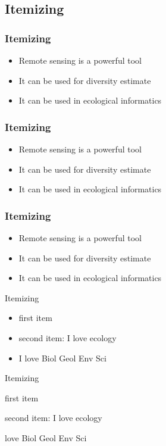 \subsection{Itemizing}

\begin{frame}
 \frametitle{Itemizing}
 \begin{itemize} %
  \item Remote sensing is a powerful tool
  \item It can be used for diversity estimate
  \item It can be used in ecological informatics
 \end{itemize}
\end{frame}


\begin{frame}
 \frametitle{Itemizing}
 \begin{itemize} %
  \item<1> Remote sensing is a powerful tool
  \item<2> It can be used for diversity estimate
  \item<3> It can be used in ecological informatics
 \end{itemize}
\end{frame}

\begin{frame}
 \frametitle{Itemizing}
 \begin{itemize} %
  \item<1-> Remote sensing is a powerful tool
  \item<2-> It can be used for diversity estimate
  \item<3-> It can be used in ecological informatics
 \end{itemize}
\end{frame}



\begin{frame}{Itemizing}
\begin{itemize}
    \item first item
    \item second item: I love ecology
    \item I love Biol Geol Env Sci
\end{itemize}
\end{frame}

\begin{frame}{Itemizing}
\begin{itemize}
\tiny{
    \item<1-> first item
    \item<2-> second item: I love ecology
    \item<3-> love Biol Geol Env Sci
}
\end{itemize}
\end{frame}

